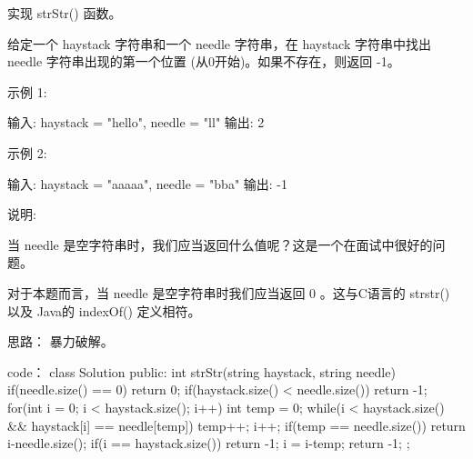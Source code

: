 实现 strStr() 函数。

给定一个 haystack 字符串和一个 needle 字符串，在 haystack 字符串中找出 needle 字符串出现的第一个位置 (从0开始)。如果不存在，则返回  -1。

示例 1:

输入: haystack = "hello", needle = "ll"
输出: 2

示例 2:

输入: haystack = "aaaaa", needle = "bba"
输出: -1

说明:

当 needle 是空字符串时，我们应当返回什么值呢？这是一个在面试中很好的问题。

对于本题而言，当 needle 是空字符串时我们应当返回 0 。这与C语言的 strstr() 以及 Java的 indexOf() 定义相符。





























思路：
暴力破解。





























code：
class Solution {
public:
    int strStr(string haystack, string needle) {
        if(needle.size() == 0) return 0;
        if(haystack.size() < needle.size()) return -1;
        for(int i = 0; i < haystack.size(); i++)
        {
            int temp = 0;
            while(i < haystack.size() && haystack[i] == needle[temp])
            {
                temp++;
                i++;
            }
            if(temp == needle.size()) return i-needle.size();
            if(i == haystack.size()) return -1;
            i = i-temp;
        }
        return -1;
    }
};